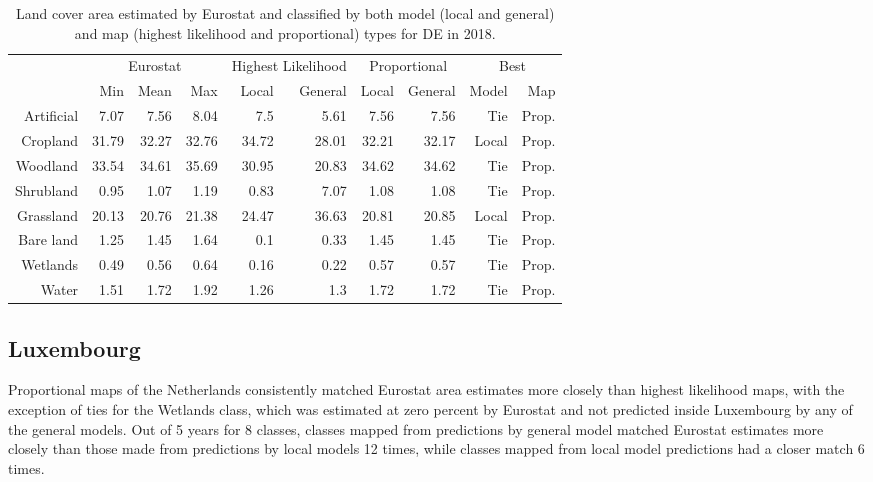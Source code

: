 \begin{table}[H]
\centering
\caption{Land cover area estimated by Eurostat and classified by both model (local and general) and map (highest likelihood and proportional) types for DE in 2018.}

\begin{tabular}{r|rrr|rr|rr|rr}
\toprule
{} & \multicolumn{3}{|c}{Eurostat} & \multicolumn{2}{|c}{Highest Likelihood} & \multicolumn{2}{|c}{Proportional} & \multicolumn{2}{|c}{Best} \\
{} &      Min &   Mean &    Max &              Local & General &        Local & General &  Model &    Map \\
\midrule
Artificial &     7.07 &   7.56 &   8.04 &                7.5 &    5.61 &         7.56 &    7.56 &    Tie &  Prop. \\
Cropland   &    31.79 &  32.27 &  32.76 &              34.72 &   28.01 &        32.21 &   32.17 &  Local &  Prop. \\
Woodland   &    33.54 &  34.61 &  35.69 &              30.95 &   20.83 &        34.62 &   34.62 &    Tie &  Prop. \\
Shrubland  &     0.95 &   1.07 &   1.19 &               0.83 &    7.07 &         1.08 &    1.08 &    Tie &  Prop. \\
Grassland  &    20.13 &  20.76 &  21.38 &              24.47 &   36.63 &        20.81 &   20.85 &  Local &  Prop. \\
Bare land  &     1.25 &   1.45 &   1.64 &                0.1 &    0.33 &         1.45 &    1.45 &    Tie &  Prop. \\
Wetlands   &     0.49 &   0.56 &   0.64 &               0.16 &    0.22 &         0.57 &    0.57 &    Tie &  Prop. \\
Water      &     1.51 &   1.72 &   1.92 &               1.26 &     1.3 &         1.72 &    1.72 &    Tie &  Prop. \\
\bottomrule
\end{tabular}
\end{table}

\subsection{Luxembourg}
Proportional maps of the Netherlands consistently matched Eurostat area estimates more closely than highest likelihood maps, with the exception of ties for the Wetlands class, which was estimated at zero percent by Eurostat and not predicted inside Luxembourg by any of the general models. Out of 5 years for 8 classes, classes mapped from predictions by general model matched Eurostat estimates more closely than those made from predictions by local models 12 times, while classes mapped from local model predictions had a closer match 6 times.

